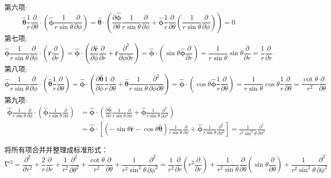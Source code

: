 第六项:
\[
\hat{\boldsymbol{\theta}}\frac{1}{r}\frac{\partial}{\partial \theta} \cdot \left(\hat{\boldsymbol{\phi}}\frac{1}{r\sin\theta}\frac{\partial}{\partial \phi}\right) = \hat{\boldsymbol{\theta}} \cdot \left(\frac{\partial\hat{\boldsymbol{\phi}}}{\partial \theta}\frac{1}{r\sin\theta}\frac{\partial}{\partial \phi} + \hat{\boldsymbol{\phi}}\frac{1}{r}\frac{\partial}{\partial \theta}\left(\frac{1}{r\sin\theta}\frac{\partial}{\partial \phi}\right)\right) = 0
\]
第七项:
\[
\hat{\boldsymbol{\phi}}\frac{1}{r\sin\theta}\frac{\partial}{\partial \phi} \cdot \left(\hat{\mathbf{r}}\frac{\partial}{\partial r}\right) = \hat{\boldsymbol{\phi}} \cdot \left(\frac{\partial\hat{\mathbf{r}}}{\partial \phi}\frac{\partial}{\partial r} + \hat{\mathbf{r}}\frac{\partial^2}{\partial\phi\partial r}\right) = \hat{\boldsymbol{\phi}} \cdot \left(\sin\theta\hat{\boldsymbol{\phi}}\frac{\partial}{\partial r}\right) = \frac{1}{r\sin\theta}\sin\theta\frac{\partial}{\partial r} = \frac{1}{r}\frac{\partial}{\partial r}
\]
第八项:
\[
\hat{\boldsymbol{\phi}}\frac{1}{r\sin\theta}\frac{\partial}{\partial \phi} \cdot \left(\hat{\boldsymbol{\theta}}\frac{1}{r}\frac{\partial}{\partial \theta}\right) = \hat{\boldsymbol{\phi}} \cdot \left(\frac{\partial\hat{\boldsymbol{\theta}}}{\partial \phi}\frac{1}{r}\frac{\partial}{\partial \theta} + \hat{\boldsymbol{\theta}}\frac{1}{r\sin\theta}\frac{\partial^2}{\partial\phi\partial\theta}\right) = \hat{\boldsymbol{\phi}} \cdot \left(\cos\theta\hat{\boldsymbol{\phi}}\frac{1}{r}\frac{\partial}{\partial \theta}\right) = \frac{1}{r\sin\theta}\cos\theta\frac{1}{r}\frac{\partial}{\partial \theta} = \frac{\cot\theta}{r^2}\frac{\partial}{\partial \theta}
\]
第九项:
\[\begin{aligned}
\hat{\boldsymbol{\phi}}\frac{1}{r\sin\theta}\frac{\partial}{\partial \phi} \cdot \left(\hat{\boldsymbol{\phi}}\frac{1}{r\sin\theta}\frac{\partial}{\partial \phi}\right) &= \hat{\boldsymbol{\phi}} \cdot \left(\frac{\partial\hat{\boldsymbol{\phi}}}{\partial \phi}\frac{1}{r\sin\theta}\frac{\partial}{\partial \phi} + \hat{\boldsymbol{\phi}}\frac{1}{r\sin\theta}\frac{\partial^2}{\partial\phi^2}\right)\\
&= \hat{\boldsymbol{\phi}} \cdot \left[(-\sin\theta\hat{\mathbf{r}} - \cos\theta\hat{\boldsymbol{\theta}})\frac{1}{r\sin\theta}\frac{\partial}{\partial \phi} + \hat{\boldsymbol{\phi}}\frac{1}{r\sin\theta}\frac{\partial^2}{\partial\phi^2}\right] = \frac{1}{r^2\sin^2\theta}\frac{\partial^2}{\partial\phi^2}
\end{aligned}
\]

将所有项合并并整理成标准形式：
\[
\nabla^2 = \frac{\partial^2}{\partial r^2} + \frac{2}{r}\frac{\partial}{\partial r} + \frac{1}{r^2}\frac{\partial^2}{\partial\theta^2} + \frac{\cot\theta}{r^2}\frac{\partial}{\partial\theta} + \frac{1}{r^2\sin^2\theta}\frac{\partial^2}{\partial\phi^2} = \frac{1}{r^2}\frac{\partial}{\partial r}\left(r^2\frac{\partial}{\partial r}\right) + \frac{1}{r^2\sin\theta}\frac{\partial}{\partial\theta}\left(\sin\theta\frac{\partial}{\partial\theta}\right) + \frac{1}{r^2\sin^2\theta}\frac{\partial^2}{\partial\phi^2}
\]

